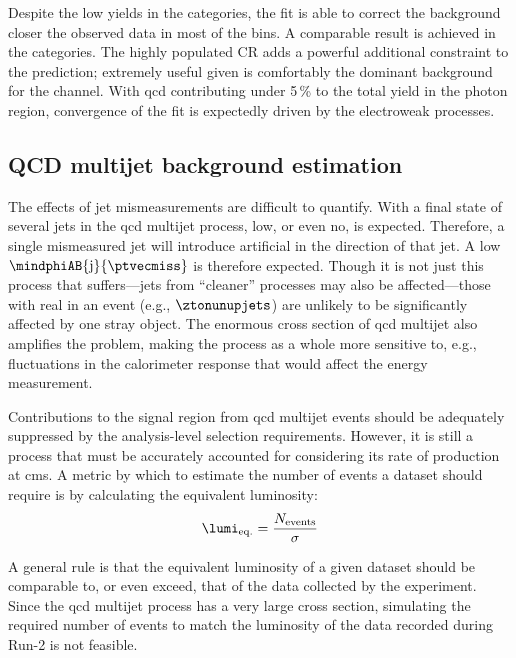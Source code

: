 Despite the low yields in the \ttH categories, the fit is able to correct the background closer the observed data in most of the bins. A comparable result is achieved in the \VH categories. The highly populated \singlePhotonCr \gls{CR} adds a powerful additional constraint to the prediction; extremely useful given \ztonunu is comfortably the dominant background for the \VH channel. With \acrshort{qcd} contributing under 5\,\% to the total yield in the photon region, convergence of the fit is expectedly driven by the electroweak processes.




\subsection{QCD multijet background estimation}
\label{subsec:htoinv_qcd_multijet_bkg}

The effects of \gls{jet} mismeasurements are difficult to quantify. With a final state of several \glspl{jet} in the \acrshort{qcd} multijet process, low, or even no, \ptvecmiss is expected. Therefore, a single mismeasured \gls{jet} will introduce artificial \ptvecmiss in the direction of that jet. A low $\mindphiAB{\mathrm{j}}{\ptvecmiss}$ is therefore expected. Though it is not just this process that suffers---\glspl{jet} from ``cleaner'' processes may also be affected---those with real \ptmiss in an event (e.g., $\ztonunupjets$) are unlikely to be significantly affected by one stray object. The enormous cross section of \acrshort{qcd} multijet also amplifies the problem, making the process as a whole more sensitive to, e.g., fluctuations in the calorimeter response that would affect the energy measurement.

Contributions to the signal region from \acrshort{qcd} multijet events should be adequately suppressed by the analysis-level selection requirements. However, it is still a process that must be accurately accounted for considering its rate of production at \acrshort{cms}. A metric by which to estimate the number of events a dataset should require is by calculating the equivalent luminosity:
\begin{equation}
    \lumi_{\mathrm{eq.}} = \frac{N_{\mathrm{events}}}{\sigma}
    \label{eq:equivalent_lumi}
\end{equation}

A general rule is that the equivalent luminosity of a given dataset should be comparable to, or even exceed, that of the data collected by the experiment. Since the \acrshort{qcd} multijet process has a very large cross section, simulating the required number of events to match the luminosity of the data recorded during Run-2 is not feasible.

